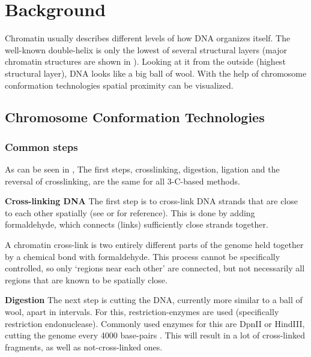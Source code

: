 \chapter{Background}\label{chap:background}



Chromatin usually describes different levels of how DNA organizes itself. The
well-known double-helix is only the lowest of several structural layers (major
chromatin structures are shown in ). Looking at it from the
outside (highest structural layer), DNA looks like a big ball of wool. With the
help of chromosome conformation technologies spatial proximity can be
visualized.




\section{Chromosome Conformation Technologies}\label{sec:cct}

\subsection{Common steps}\label{sec:common}

As can be seen in , The first steps, crosslinking, digestion,
ligation and the reversal of crosslinking, are the same for all 3-C-based methods.


\textbf{Cross-linking DNA}\label{sec:crosslinking}
The first step is to cross-link DNA strands that are close to each other
spatially (see  or  for reference). This is done by adding
formaldehyde, which connects (links) sufficiently close strands together.

A chromatin cross-link is two entirely different parts of the genome held
together by a chemical bond with formaldehyde. This process cannot be
specifically controlled, so only `regions near each other' are connected, but
not necessarily all regions that are known to be spatially close.


\textbf{Digestion}\label{sec:digestion}
The next step is cutting the DNA, currently more similar to a ball of wool,
apart in intervals. For this, restriction-enzymes are used (specifically
restriction endonuclease). Commonly used enzymes for this are DpnII or HindIII,
cutting the genome every 4000 base-pairs \cite{lieberman2009comprehensive}.
This will result in a lot of cross-linked fragments, as well as
not-cross-linked ones.


